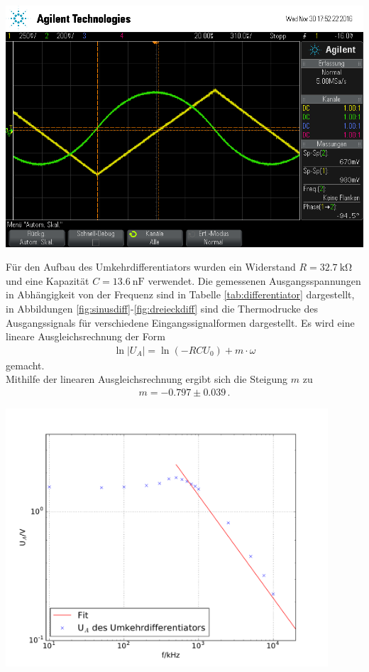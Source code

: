 \documentclass[]{scrartcl}
\begin{document}
\begin{minipage}[t]{0.5\textwidth}
	\includegraphics[width=\textwidth]{images/dreieck_int}
	\label{fig:dreieckint}
\end{minipage}
Für den Aufbau des Umkehrdifferentiators wurden ein Widerstand $R=\SI{32.7}{\kilo\ohm}$ und eine Kapazität $C=\SI{13.6}{\nano\farad}$ verwendet. Die gemessenen Ausgangsspannungen in Abhängigkeit von der Frequenz sind in Tabelle \ref{tab:differentiator} dargestellt, in Abbildungen \ref{fig:sinusdiff}-\ref{fig:dreieckdiff} sind die Thermodrucke des Ausgangssignals für verschiedene Eingangssignalformen dargestellt.
Es wird eine lineare Ausgleichsrechnung der Form 
\begin{align}
\ln |U_A| = \ln\left(-RCU_0\right)+m\cdot\omega
\end{align}
gemacht. \\
Mithilfe der linearen Ausgleichsrechnung ergibt sich die Steigung $m$ zu
\begin{align*}
m = -0.797 \pm 0.039\,.
\end{align*}
\begin{center}
	\includegraphics[width=12cm]{images/differentiator.pdf}
	\label{fig:differentiator}
\end{center}
\end{document}
